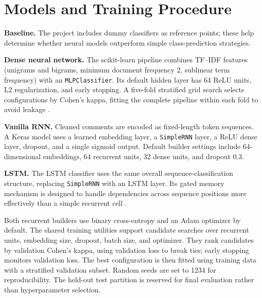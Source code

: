 \section{Models and Training Procedure}
\textbf{Baseline.} The project includes dummy classifiers as reference points; these help determine whether neural models outperform simple class-prediction strategies.

\textbf{Dense neural network.} The scikit-learn pipeline combines TF--IDF features (unigrams and bigrams, minimum document frequency 2, sublinear term frequency) with an \texttt{MLPClassifier}. Its default hidden layer has 64 ReLU units, L2 regularization, and early stopping. A five-fold stratified grid search selects configurations by Cohen's kappa, fitting the complete pipeline within each fold to avoid leakage \cite{pedregosa2011scikit}.

\textbf{Vanilla RNN.} Cleaned comments are encoded as fixed-length token sequences. A Keras model uses a learned embedding layer, a \texttt{SimpleRNN} layer, a ReLU dense layer, dropout, and a single sigmoid output. Default builder settings include 64-dimensional embeddings, 64 recurrent units, 32 dense units, and dropout 0.3.

\textbf{LSTM.} The LSTM classifier uses the same overall sequence-classification structure, replacing \texttt{SimpleRNN} with an LSTM layer. Its gated memory mechanism is designed to handle dependencies across sequence positions more effectively than a simple recurrent cell \cite{hochreiter1997long}.

Both recurrent builders use binary cross-entropy and an Adam optimizer by default. The shared training utilities support candidate searches over recurrent units, embedding size, dropout, batch size, and optimizer. They rank candidates by validation Cohen's kappa, using validation loss to break ties; early stopping monitors validation loss. The best configuration is then fitted using training data with a stratified validation subset. Random seeds are set to 1234 for reproducibility. The held-out test partition is reserved for final evaluation rather than hyperparameter selection.
